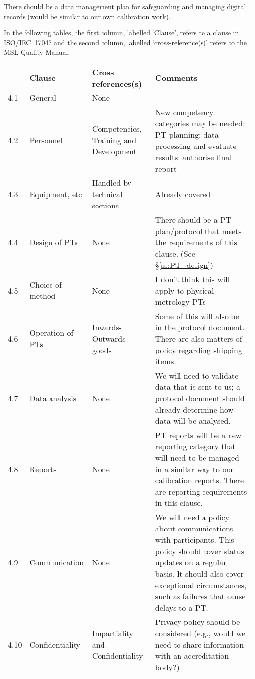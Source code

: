 There should be a data management plan for safeguarding and managing digital records (would be similar to our own calibration work).

In the following tables, the first column, labelled `Clause', refers to a clause in ISO/IEC~17043 and the second column, labelled `cross-reference(s)' refers to the MSL Quality Manual.

\begin{center}
{\renewcommand*{\arraystretch}{1.4}
\begin{tabular}{p{1em}p{10em}p{12em}p{16em}}
	\rowcolor[rgb]{ 0,  0,  0} 
	\textcolor[rgb]{ 1,  1,  1}{} & 
	\textcolor[rgb]{ 1,  1,  1}{\textbf{Clause}} & 
	\textcolor[rgb]{ 1,  1,  1}{\textbf{Cross references(s)}} &
	\textcolor[rgb]{ 1,  1,  1}{\textbf{Comments}} \\
4.1 & General & None &   \\
4.2	& Personnel &
Competencies, Training and Development \cite[\S\ref*{QM-s:competencies_professional_development}]{MSL_Quality_Manual} & 
New competency categories may be needed: PT planning; data processing and evaluate results; authorise final report \\
4.3	& Equipment, etc & Handled by technical sections	& Already covered \\
4.4	& Design of PTs	& None	& There should be a PT plan/protocol that meets the requirements of this clause. (See \S\ref{ss:PT_design}) \\
4.5	& Choice of method	& None	& I don't think this will apply to physical metrology PTs \\
4.6	& Operation of PTs	& Inwards-Outwards goods \cite[\S\ref*{QM-s:inwards_outwards_goods}]{MSL_Quality_Manual} & 
Some of this will also be in the protocol document. There are also matters of policy regarding shipping items. \\
4.7	& Data analysis	& None	& We will need to validate data that is sent to us; a protocol document should already determine how data will be analysed.\\
4.8	& Reports	& None	& PT reports will be a new reporting category that will need to be managed in a similar way to our calibration reports. There are reporting requirements in this clause.\\
4.9	& Communication	& None	& We will need a policy about communications with participants. This policy should cover status updates on a regular basis. It should also cover exceptional circumstances, such as failures that cause delays to a PT. \\
4.10	& Confidentiality	& Impartiality \cite[\S\ref*{QM-sssp:impartiality}]{MSL_Quality_Manual} and Confidentiality \cite[\S\ref*{QM-sss:confidentiality}]{MSL_Quality_Manual} & Privacy policy should be considered  (e.g., would we need to share information with an accreditation body?)

\end{tabular} } 
\end{center}

